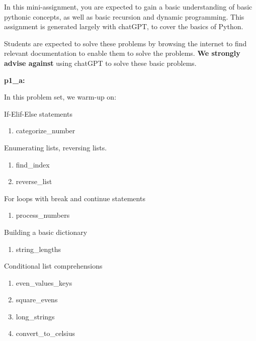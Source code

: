 \documentclass{hw}
\begin{document}
\newpage


In this mini-assignment, you are expected to gain a basic understanding of basic pythonic concepts, as well as basic recursion and dynamic programming. This assignment is generated largely with chatGPT, to cover the basics of Python.

Students are expected to solve these problems by browsing the internet to find relevant documentation to enable them to solve the problems. \textbf{We strongly advise against} using chatGPT to solve these basic problems.

\begin{problem}
\textbf{p1\_a:}

In this problem set, we warm-up on:

\begin{subproblem}
If-Elif-Else statements
\begin{enumerate}
    \item categorize\_number
\end{enumerate}
\end{subproblem}

\begin{subproblem}
Enumerating lists, reversing lists.
\begin{enumerate}
    \item find\_index
    \item reverse\_list
\end{enumerate}
\end{subproblem}

\begin{subproblem}
For loops with break and continue statements
\begin{enumerate}
    \item process\_numbers
\end{enumerate}
\end{subproblem}

\begin{subproblem}
Building a basic dictionary
\begin{enumerate}
    \item string\_lengths
\end{enumerate}
\end{subproblem}

\begin{subproblem}
Conditional list comprehensions
\begin{enumerate}
    \item even\_values\_keys
    \item square\_evens
    \item long\_strings
    \item convert\_to\_celsius
\end{enumerate}
\end{subproblem}

\end{problem}
\end{document}
